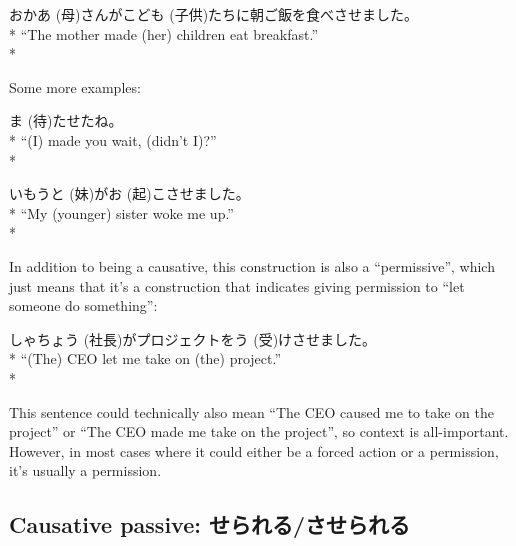 \documentclass[11pt, b5paper, twoside, openright, onecolumn]{book}
\makeatletter
\newcommand*{\rubystack}[2]{{\relscale{0.5}%
  \begin{tabular}[b]{@{}c@{}}%
    {#1}\\%
   {\textscale{2}{#2}}%
  \end{tabular}}%
}
\DeclareRobustCommand*{\ruby}[2]{%
  \mbox{%
    \setlength{\parskip}{0ex}%
    \BeginAccSupp{method=pdfstringdef,ActualText={#1}}%
      \rubystack{\phantom{#2}}{#1}%
      \llap{%
        \rubystack{#2}{\phantom{#1}}%
      }%
    \EndAccSupp{}%
  }%
}
\renewcommand*{\ruby}[2]{#2 (#1)}%
\newenvironment{exampleblock}{
\setlength{\parindent}{0.6in}
\begin{minipage}[t]{\dimexpr\textwidth-\parindent}}
{\end{minipage}}
\makeatother
\begin{document}
\vspace{0.4cm}
\begin{exampleblock}
お\ruby{母}{かあ}さんが\ruby{子供}{こども}たちに朝ご飯を食べさせました。 \\* 
“The mother made (her) children eat breakfast.” \\* 
\end{exampleblock}
\vspace{0.2cm}

Some more examples:

\vspace{0.4cm}
\begin{exampleblock}
\ruby{待}{ま}たせたね。 \\* 
“(I) made you wait‚ (didn’t I)?” \\* 
\end{exampleblock}
\vspace{0.2cm}

\begin{exampleblock}
\ruby{妹}{いもうと}が\ruby{起}{お}こさせました。 \\* 
“My (younger) sister woke me up.” \\* 
\end{exampleblock}
\vspace{0.2cm}

In addition to being a causative‚ this construction is also a “permissive”‚ which just means that it’s a construction that indicates giving permission to “let someone do something”:

\vspace{0.4cm}
\begin{exampleblock}
\ruby{社長}{しゃちょう}がプロジェクトを\ruby{受}{う}けさせました。 \\* 
“(The) CEO let me take on (the) project.” \\* 
\end{exampleblock}
\vspace{0.2cm}

This sentence could technically also mean “The CEO caused me to take on the project” or “The CEO made me take on the project”‚ so context is all-important. However‚ in most cases where it could either be a forced action or a permission‚ it’s usually a permission.

\subsection{Causative passive: せられる/させられる}
\end{document}
